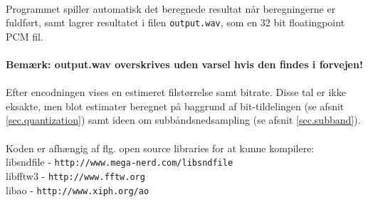 \\
Programmet spiller automatisk det beregnede resultat når beregningerne
er fuldført, samt lagrer resultatet i filen \texttt{output.wav}, som en 32
bit floatingpoint PCM fil.\\
\\
\textbf{Bemærk: output.wav overskrives uden varsel hvis den findes i
  forvejen!}\\
\\
Efter encodningen vises en estimeret filstørrelse samt bitrate. Disse tal er ikke eksakte, men blot estimater beregnet på baggrund af bit-tildelingen (se afsnit \ref{sec.quantization}) samt ideen om subbåndsnedsampling (se afsnit \ref{sec.subband}).\\
\\
Koden er afhængig af flg. open source libraries for at kunne kompilere:\\
libsndfile - \texttt{http://www.mega-nerd.com/libsndfile}\\
libfftw3 - \texttt{http://www.fftw.org}\\
libao - \texttt{http://www.xiph.org/ao}
